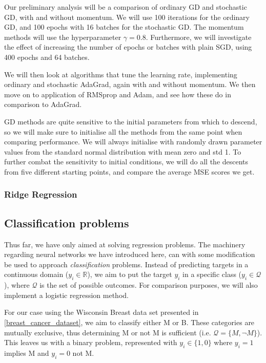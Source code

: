         Our preliminary analysis will be a comparison of ordinary GD and stochastic GD, with and without momentum. We will use 100 iterations for the ordinary GD, and 100 epochs with 16 batches for the stochastic GD. The momentum methods will use the hyperparameter $\gamma=0.8$. Furthermore, we will investigate the effect of increasing the number of epochs or batches with plain SGD, using 400 epochs and 64 batches.

        We will then look at algorithms that tune the learning rate, implementing ordinary and stochastic AdaGrad, again with and without momentum. We then move on to application of RMSprop and Adam, and see how these do in comparison to AdaGrad.

        GD methods are quite sensitive to the initial parameters from which to descend, so we will make sure to initialise all the methods from the same point when comparing performance. We will always initialise with randomly drawn parameter values from the standard normal distribution with mean zero and std 1. To further combat the sensitivity to initial conditions, we will do all the descents from five different starting points, and compare the average MSE scores we get.
        \\

    \subsubsection{Ridge Regression}

    
\subsection{Classification problems}
    Thus far, we have only aimed at solving regression problems. The machinery regarding neural networks we have introduced here, can with some modification be used to approach \textit{classification} problems. Instead of predicting targets in a continuous domain ($y_i \in \mathbb{R}$), we aim to put the target $y_i$ in a specific class ($y_i \in \mathcal{Q}$), where $\mathcal{Q}$ is the set of possible outcomes. For comparison purposes, we will also implement a logistic regression method.

    For our case using the Wisconsin Breast data set presented in \cref{breast_cancer_dataset}, we aim to classify either M or B. These categories are mutually exclusive, thus determining M or not M is sufficient (i.e. $\mathcal{Q} = \{ M, \neg M \}$). This leaves us with a binary problem, represented with $y_i \in \{ 1, 0 \}$ where $y_i = 1$ implies M and $y_i = 0$ not M.

